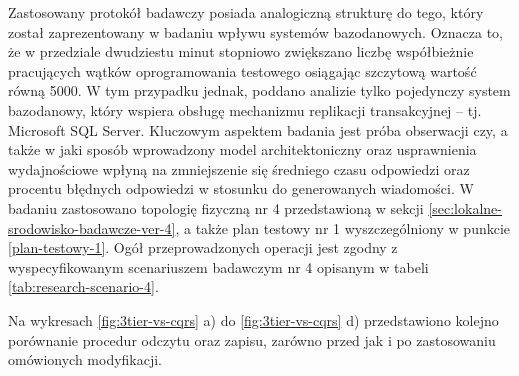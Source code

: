 Zastosowany protokół badawczy posiada analogiczną strukturę do tego, który został zaprezentowany w badaniu wpływu systemów bazodanowych. Oznacza to, że w przedziale dwudziestu minut stopniowo zwiększano liczbę współbieżnie pracujących wątków oprogramowania testowego osiągając szczytową wartość równą 5000. W tym przypadku jednak, poddano analizie tylko pojedynczy system bazodanowy, który wspiera obsługę mechanizmu replikacji transakcyjnej -- tj. Microsoft SQL Server. Kluczowym aspektem badania jest próba obserwacji czy, a także w jaki sposób wprowadzony model architektoniczny oraz usprawnienia wydajnościowe wpłyną na zmniejszenie się średniego czasu odpowiedzi oraz procentu błędnych odpowiedzi w stosunku do generowanych wiadomości. W badaniu zastosowano topologię fizyczną nr 4 przedstawioną w sekcji \ref{sec:lokalne-srodowisko-badawcze-ver-4}, a także plan testowy nr 1 wyszczególniony w punkcie \ref{plan-testowy-1}. Ogół przeprowadzonych operacji jest zgodny z wyspecyfikowanym scenariuszem badawczym nr 4 opisanym w tabeli \ref{tab:research-scenario-4}.

Na wykresach \ref{fig:3tier-vs-cqrs} a) do \ref{fig:3tier-vs-cqrs} d) przedstawiono kolejno porównanie procedur odczytu oraz zapisu, zarówno przed jak i po zastosowaniu omówionych modyfikacji.

